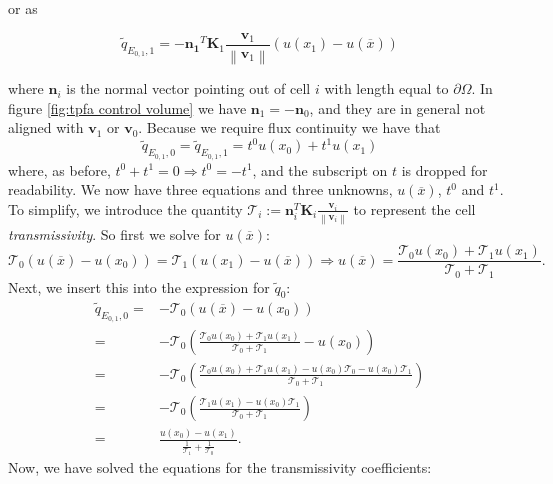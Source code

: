 \documentclass[../Main/main.tex]{subfiles}
\begin{document}
	or as
	
	\begin{equation}\label{eq:f_1}
		\tilde{q}_{E_{0,1},1} = -\bm{n_1}^T \bm{K}_1  \frac{\bm{v}_1}{\left \| \bm{v}_1 \right \|} (u(x_1)-u(\overline{x}))
	\end{equation}	
	
	where $\bm{n}_i$ is the normal vector pointing out of cell $i$ with length equal to $\partial \Omega$. In figure \ref{fig:tpfa control volume} we have $\bm{n}_1 = -\bm{n}_0$, and they are in general not aligned with $\bm{v}_1$ or $\bm{v}_0$.
	Because we require flux continuity we have that 
	\begin{equation}
		\tilde{q}_{E_{0,1},0} = \tilde{q}_{E_{0,1},1} = t^0 u(x_0) + t^1 u(x_1)
	\end{equation}
	where, as before, $t^0 + t^1 = 0 \Rightarrow t^0 = -t^1$, and the subscript on $t$ is dropped for readability. We now have three equations and three unknowns, $u(\overline{x})$, $t^0$ and $t^1$. To simplify, we introduce the quantity $\mathcal{T}_i := \bm{n}_i^T \bm{K}_i  \frac{\bm{v}_i}{\left \| \bm{v}_i \right \|} $ to represent the cell \emph{transmissivity}. So first we solve for $u(\overline{x})$:
	\begin{equation}
		\mathcal{T}_0(u(\overline{x})-u(x_0)) = \mathcal{T}_1(u(x_1)-u(\overline{x})) \Rightarrow u(\overline{x}) = \frac{\mathcal{T}_0 u(x_0) + \mathcal{T}_1 u(x_1)}{\mathcal{T}_0 + \mathcal{T}_1}.
	\end{equation}
	Next, we insert this into the expression for $\tilde{q}_0$:
	\begin{equation}
		\begin{aligned}
			\tilde{q}_{E_{0,1},0} =& -\mathcal{T}_0(u(\overline{x})-u(x_0)) \\
			=& -\mathcal{T}_0\left (\frac{\mathcal{T}_0 u(x_0) + \mathcal{T}_1 u(x_1)}{\mathcal{T}_0 + \mathcal{T}_1} - u(x_0)\right )\\
			=& -\mathcal{T}_0\left (\frac{\mathcal{T}_0 u(x_0) + \mathcal{T}_1 u(x_1) - u(x_0)\mathcal{T}_0 - u(x_0)\mathcal{T}_1}{\mathcal{T}_0 + \mathcal{T}_1}\right ) \\
			=& -\mathcal{T}_0\left (\frac{ \mathcal{T}_1 u(x_1)  - u(x_0)\mathcal{T}_1}{\mathcal{T}_0 + \mathcal{T}_1}\right)\\
			=& \frac{u(x_0)-u(x_1)}{\frac{1}{\mathcal{T}_1} + \frac{1}{\mathcal{T}_0}}.
		\end{aligned}
	\end{equation}
	Now, we have solved the equations for the transmissivity coefficients:
\end{document}
